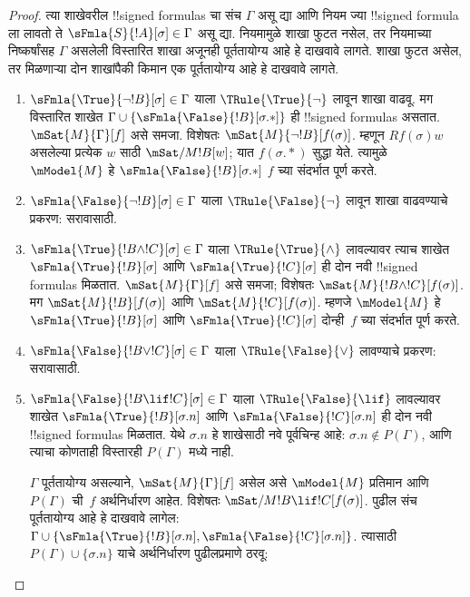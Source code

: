 \documentclass[../../../include/open-logic-section]{subfiles}
\begin{document}
\begin{proof}
त्या शाखेवरील !!{signed formula}s
चा संच $\Gamma$ असू द्या आणि
नियम ज्या !!{signed formula}
ला लावतो ते
$\sFmla{S}{!A}[\sigma] \in \Gamma$
असू द्या. नियमामुळे शाखा फुटत
नसेल, तर नियमाच्या निष्कर्षांसह
$\Gamma$ असलेली विस्तारित शाखा
अजूनही पूर्ततायोग्य आहे हे
दाखवावे लागते. शाखा फुटत
असेल, तर मिळणाऱ्या दोन शाखांपैकी
किमान एक पूर्ततायोग्य आहे हे
दाखवावे लागते.
\begin{enumerate}
\item $\sFmla{\True}{\lnot !B}[\sigma] \in \Gamma$
  याला $\TRule{\True}{\lnot}$ लावून
  शाखा वाढवू. मग विस्तारित
  शाखेत $\Gamma \cup
  \{\sFmla{\False}{!B}[\sigma.{*}]\}$
  ही !!{signed formula}s असतात.
  $\mSat{M}{\Gamma}[f]$ असे समजा.
  विशेषतः
  $\mSat{M}{\lnot !B}[f(\sigma)]$.
  म्हणून $Rf(\sigma)w$ असलेल्या
  प्रत्येक $w$ साठी
  $\mSat/{M}{!B}[w]$; यात
  $f(\sigma.{*})$ सुद्धा येते.
  त्यामुळे $\mModel{M}$ हे
  $\sFmla{\False}{!B}[\sigma.{*}]$
  $f$ च्या संदर्भात पूर्ण करते.
\item $\sFmla{\False}{\lnot !B}[\sigma] \in \Gamma$
  याला $\TRule{\False}{\lnot}$
  लावून शाखा वाढवण्याचे प्रकरण:
  सरावासाठी.
\item $\sFmla{\True}{!B \land !C}[\sigma] \in \Gamma$
  याला $\TRule{\True}{\land}$
  लावल्यावर त्याच शाखेत
  $\sFmla{\True}{!B}[\sigma]$
  आणि $\sFmla{\True}{!C}[\sigma]$
  ही दोन नवी !!{signed formula}s
  मिळतात. $\mSat{M}{\Gamma}[f]$
  असे समजा; विशेषतः
  $\mSat{M}{!B \land
    !C}[f(\sigma)]$. मग
  $\mSat{M}{!B}[f(\sigma)]$
  आणि $\mSat{M}{!C}[f(\sigma)]$.
  म्हणजे $\mModel{M}$ हे
  $\sFmla{\True}{!B}[\sigma]$
  आणि $\sFmla{\True}{!C}[\sigma]$
  दोन्ही~$f$ च्या संदर्भात
  पूर्ण करते.
\item $\sFmla{\False}{!B \lor !C}[\sigma] \in \Gamma$
  याला $\TRule{\False}{\lor}$
  लावण्याचे प्रकरण: सरावासाठी.
\item $\sFmla{\False}{!B \lif !C}[\sigma] \in \Gamma$
  याला $\TRule{\False}{\lif}$
  लावल्यावर शाखेत
  $\sFmla{\True}{!B}[\sigma.n]$
  आणि $\sFmla{\False}{!C}[\sigma.n]$
  ही दोन नवी !!{signed formula}s
  मिळतात. येथे $\sigma.n$
  हे शाखेसाठी नवे पूर्वचिन्ह आहे: $\sigma.n\notin P(\Gamma)$,
  आणि त्याचा कोणताही विस्तारही $P(\Gamma)$ मध्ये नाही.

  $\Gamma$ पूर्ततायोग्य असल्याने,
  $\mSat{M}{\Gamma}[f]$ असेल
  असे $\mModel{M}$ प्रतिमान
  आणि $P(\Gamma)$ ची~$f$
  अर्थनिर्धारण आहेत. विशेषतः
  $\mSat/{M}{!B \lif !C}[f(\sigma)]$.
  पुढील संच पूर्ततायोग्य आहे हे
  दाखवावे लागेल:
  $\Gamma \cup
  \{\sFmla{\True}{!B}[\sigma.n],
  \sFmla{\False}{!C}[\sigma.n]\}$.
  त्यासाठी $P(\Gamma)
  \cup \{\sigma.n\}$
  याचे अर्थनिर्धारण पुढीलप्रमाणे
  ठरवू:


\end{enumerate}
\end{proof}
\end{document}
